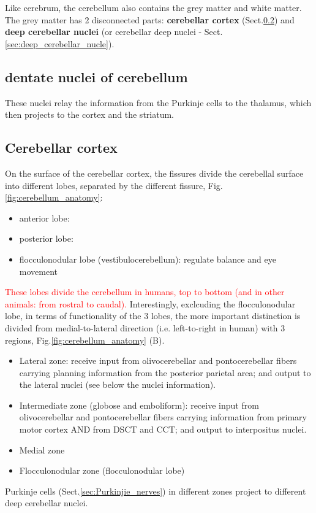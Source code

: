 Like cerebrum, the cerebellum also contains the grey matter and white matter.
The grey matter has 2 disconnected parts: {\bf cerebellar cortex}
(Sect.\ref{sec:cerebellar_cortex}) and {\bf deep cerebellar nuclei} (or
cerebellar deep nuclei - Sect.\ref{sec:deep_cerebellar_nucle}).

\subsection{dentate nuclei of cerebellum}
\label{sec:dentate-nuclei-cerebellum}

These nuclei relay the information from the Purkinje cells to the thalamus,
which then projects to the cortex and the striatum.

\subsection{Cerebellar cortex}
\label{sec:cerebellar_cortex}

On the surface of the cerebellar cortex, the fissures divide the cerebellal
surface into different lobes, separated by the different fissure,
Fig.\ref{fig:cerebellum_anatomy}:
\begin{itemize}
  \item anterior lobe:
  \item posterior lobe: 
  \item flocculonodular lobe (vestibulocerebellum): regulate balance and eye
  movement
\end{itemize}
\textcolor{red}{These lobes divide the cerebellum in humans, top to
bottom (and in other animals: from rostral to caudal).} 
Interestingly, exclcuding the flocculonodular lobe, in terms of functionality
of the 3 lobes, the more important distinction is divided from medial-to-lateral
direction (i.e. left-to-right in human) with 3 regions,
Fig.\ref{fig:cerebellum_anatomy} (B).
\begin{itemize}
  \item Lateral zone: receive input from
  olivocerebellar and pontocerebellar fibers carrying planning information from
  the posterior parietal area; and output to the lateral nuclei (see below the
  nuclei information).
   
  \item Intermediate zone (globose and emboliform): receive input from
  olivocerebellar and pontocerebellar fibers carrying information from primary
   motor cortex AND from DSCT and CCT; and output to 
  interpositus nuclei.
  
  \item Medial zone
  \item Flocculonodular zone (flocculonodular lobe)
\end{itemize}
\label{sec:cerebellum_zones}
Purkinje cells (Sect.\ref{sec:Purkinjie_nerves}) in different zones project to
different deep cerebellar nuclei.
 
